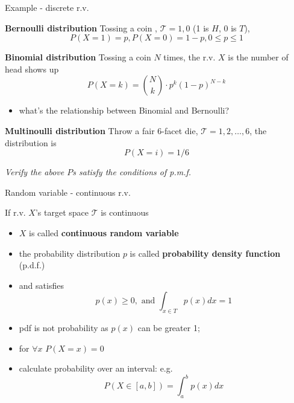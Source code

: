\documentclass{scrartcl}
\def\tightlist{}
\begin{document}
\begin{frame}{Example - discrete r.v.}
\protect\hypertarget{example---discrete-r.v.}{}

\textbf{Bernoulli distribution} Tossing a coin ,
\(\mathcal{T} = {1, 0}\) (1 is \(H\), 0 is \(T\)),
\[P(X=1) = p , P(X=0) = 1-p, 0\leq p\leq 1\]

\textbf{Binomial distribution} Tossing a coin \(N\) times, the r.v.
\(X\) is the number of head shows up
\[P(X=k) = \binom{N}{k} \cdot p^k(1-p)^{N-k}\]

\begin{itemize}
\item
  what's the relationship between Binomial and Bernoulli?

  \bigskip
\end{itemize}

\textbf{Multinoulli distribution} Throw a fair 6-facet die,
\(\mathcal{T} = {1, 2,\ldots, 6}\), the distribution is \[P(X=i) = 1/6\]

\emph{Verify the above \(P\)s satisfy the conditions of p.m.f.}

\end{frame}

\begin{frame}{Random variable - continuous r.v.}
\protect\hypertarget{random-variable---continuous-r.v.}{}

If r.v. \(X\)'s target space \(\mathcal{T}\) is continuous

\begin{itemize}
\tightlist
\item
  \(X\) is called \textbf{continuous random variable }
\item
  the probability distribution \(p\) is called \textbf{probability
  density function} (p.d.f.)
\item
  and satisfies \[p(x) \geq 0, \text{ and } \int_{x\in T} p(x) dx = 1\]
\item
  pdf is not probability as \(p(x)\) can be greater 1;
\item
  for \(\forall x\) \(P(X=x) =0\)\\
\item
  calculate probability over an interval: e.g.
  \[P(X \in [a,b]) = \int_{a}^b p(x) dx\]
\end{itemize}

\end{frame}
\end{document}
